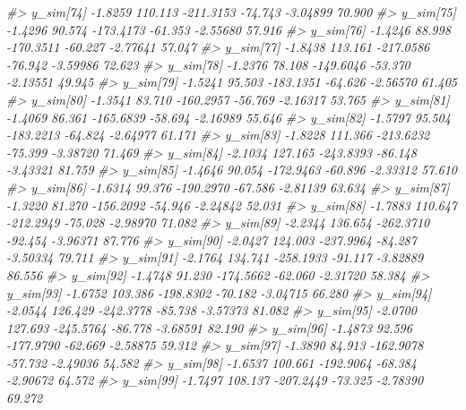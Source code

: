 \documentclass[
  10pt,
  italian,
  a4paper,
  extrafontsizes,onecolumn,openright
  ]{memoir}
\newenvironment{Shaded}{\begin{snugshade}}{\end{snugshade}}
\newcommand{\CommentTok}[1]{\textcolor[rgb]{0.56,0.35,0.01}{\textit{#1}}}
\begin{document}
\begin{Shaded}
\begin{Highlighting}[]
\CommentTok{\#\textgreater{}   y\_sim[74]  {-}1.8259 110.113 {-}211.3153 {-}74.743 {-}3.04899 70.900}
\CommentTok{\#\textgreater{}   y\_sim[75]  {-}1.4296  90.574 {-}173.4173 {-}61.353 {-}2.55680 57.916}
\CommentTok{\#\textgreater{}   y\_sim[76]  {-}1.4246  88.998 {-}170.3511 {-}60.227 {-}2.77641 57.047}
\CommentTok{\#\textgreater{}   y\_sim[77]  {-}1.8438 113.161 {-}217.0586 {-}76.942 {-}3.59986 72.623}
\CommentTok{\#\textgreater{}   y\_sim[78]  {-}1.2376  78.108 {-}149.6046 {-}53.370 {-}2.13551 49.945}
\CommentTok{\#\textgreater{}   y\_sim[79]  {-}1.5241  95.503 {-}183.1351 {-}64.626 {-}2.56570 61.405}
\CommentTok{\#\textgreater{}   y\_sim[80]  {-}1.3541  83.710 {-}160.2957 {-}56.769 {-}2.16317 53.765}
\CommentTok{\#\textgreater{}   y\_sim[81]  {-}1.4069  86.361 {-}165.6839 {-}58.694 {-}2.16989 55.646}
\CommentTok{\#\textgreater{}   y\_sim[82]  {-}1.5797  95.504 {-}183.2213 {-}64.824 {-}2.64977 61.171}
\CommentTok{\#\textgreater{}   y\_sim[83]  {-}1.8228 111.366 {-}213.6232 {-}75.399 {-}3.38720 71.469}
\CommentTok{\#\textgreater{}   y\_sim[84]  {-}2.1034 127.165 {-}243.8393 {-}86.148 {-}3.43321 81.759}
\CommentTok{\#\textgreater{}   y\_sim[85]  {-}1.4646  90.054 {-}172.9463 {-}60.896 {-}2.33312 57.610}
\CommentTok{\#\textgreater{}   y\_sim[86]  {-}1.6314  99.376 {-}190.2970 {-}67.586 {-}2.81139 63.634}
\CommentTok{\#\textgreater{}   y\_sim[87]  {-}1.3220  81.270 {-}156.2092 {-}54.946 {-}2.24842 52.031}
\CommentTok{\#\textgreater{}   y\_sim[88]  {-}1.7883 110.647 {-}212.2949 {-}75.028 {-}2.98970 71.082}
\CommentTok{\#\textgreater{}   y\_sim[89]  {-}2.2344 136.654 {-}262.3710 {-}92.454 {-}3.96371 87.776}
\CommentTok{\#\textgreater{}   y\_sim[90]  {-}2.0427 124.003 {-}237.9964 {-}84.287 {-}3.50334 79.711}
\CommentTok{\#\textgreater{}   y\_sim[91]  {-}2.1764 134.741 {-}258.1933 {-}91.117 {-}3.82889 86.556}
\CommentTok{\#\textgreater{}   y\_sim[92]  {-}1.4748  91.230 {-}174.5662 {-}62.060 {-}2.31720 58.384}
\CommentTok{\#\textgreater{}   y\_sim[93]  {-}1.6752 103.386 {-}198.8302 {-}70.182 {-}3.04715 66.280}
\CommentTok{\#\textgreater{}   y\_sim[94]  {-}2.0544 126.429 {-}242.3778 {-}85.738 {-}3.57373 81.082}
\CommentTok{\#\textgreater{}   y\_sim[95]  {-}2.0700 127.693 {-}245.5764 {-}86.778 {-}3.68591 82.190}
\CommentTok{\#\textgreater{}   y\_sim[96]  {-}1.4873  92.596 {-}177.9790 {-}62.669 {-}2.58875 59.312}
\CommentTok{\#\textgreater{}   y\_sim[97]  {-}1.3890  84.913 {-}162.9078 {-}57.732 {-}2.49036 54.582}
\CommentTok{\#\textgreater{}   y\_sim[98]  {-}1.6537 100.661 {-}192.9064 {-}68.384 {-}2.90672 64.572}
\CommentTok{\#\textgreater{}   y\_sim[99]  {-}1.7497 108.137 {-}207.2449 {-}73.325 {-}2.78390 69.272}

\end{Highlighting}
\end{Shaded}
\end{document}
